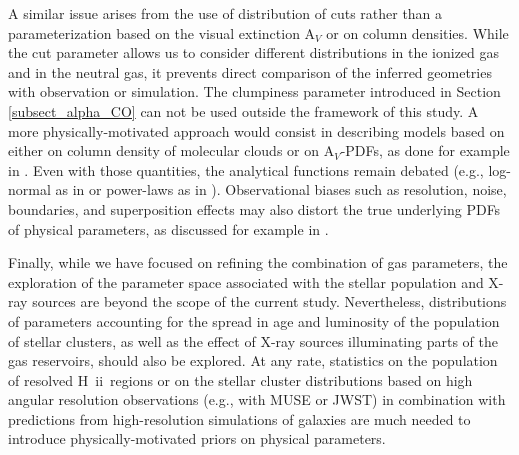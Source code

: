 \documentclass{aa}
\newcommand{\hii}{H~{\sc ii}}
\begin{document}
A similar issue arises from the use of distribution of cuts rather than a parameterization based on the visual extinction A$_V$ or on column densities. While the cut parameter allows us to consider different distributions in the ionized gas and in the neutral gas, it prevents direct comparison of the inferred geometries with observation or simulation. The clumpiness parameter introduced in Section \ref{subsect_alpha_CO} can not be used outside the framework of this study. A more physically-motivated approach would consist in describing models based on either on column density of molecular clouds or on A$_V$-PDFs, as done for example in \cite{Bisbas_2019, Bisbas_2023}. Even with those quantities, the analytical functions remain debated (e.g., log-normal as in \cite{Bisbas_2019, Bisbas_2023} or power-laws as in \cite{Brunt_2015, Lombardi_2015}). Observational biases such as resolution, noise, boundaries, and superposition effects may also distort the true underlying PDFs of physical parameters, as discussed for example in \cite{Lombardi_2015}. 

Finally, while we have focused on refining the combination of gas parameters, the exploration of the parameter space associated with the stellar population and X-ray sources are beyond the scope of the current study. Nevertheless, distributions of parameters accounting for the spread in age and luminosity of the population of stellar clusters, as well as the effect of X-ray sources illuminating parts of the gas reservoirs, should also be explored. At any rate, statistics on the population of resolved \hii\ regions or on the stellar cluster distributions based on high angular resolution observations (e.g., with MUSE or JWST) in combination with predictions from high-resolution simulations of galaxies are much needed to introduce physically-motivated priors on physical parameters.




   
\end{document}
